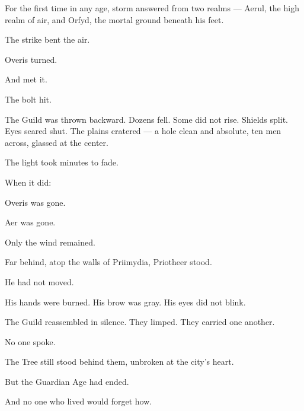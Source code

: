 \documentclass[9pt]{article}
\begin{document}
For the first time in any age, storm answered from two realms — Aerul, the high realm of air, and Orfyd, the mortal ground beneath his feet.

The strike bent the air.

Overis turned.

And met it.

The bolt hit.

The Guild was thrown backward. Dozens fell. Some did not rise. Shields split. Eyes seared shut. The plains cratered — a hole clean and absolute, ten men across, glassed at the center.

The light took minutes to fade.

When it did:

Overis was gone.

Aer was gone.

Only the wind remained.

Far behind, atop the walls of Priimydia, Priotheer stood.

He had not moved.

His hands were burned. His brow was gray. His eyes did not blink.

The Guild reassembled in silence. They limped. They carried one another.

No one spoke.

The Tree still stood behind them, unbroken at the city’s heart.

But the Guardian Age had ended.

And no one who lived would forget how.


\newpage
\end{document}
